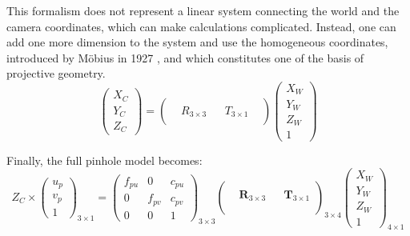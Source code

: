 This formalism does not represent a linear system connecting the world and the camera coordinates, which can make calculations complicated. Instead, one can add one more dimension to the system and use the homogeneous coordinates, introduced by Möbius in 1927 \cite{Mobius1827}, and which constitutes one of the basis of projective geometry.
\begin{equation}\label{homogeneous}
  \begin{pmatrix}X_C\\Y_C\\Z_C\end{pmatrix}
  = \begin{pmatrix} &  & & \\ & R_{3\times 3} &  & T_{3\times 1} \\ &&&&\end{pmatrix} \begin{pmatrix}X_W\\Y_W\\Z_W\\1\end{pmatrix}
\end{equation}

Finally, the full pinhole model becomes:%
\begin{equation}\label{eq:pinhole}
  \boxed{
  Z_C \times \begin{pmatrix}u_p\\v_p\\1\end{pmatrix}_{\!\!3\times 1} 
  = \begin{pmatrix}f_{pu} & 0 & c_{pu}\\ 0 & f_{pv} & c_{pv} \\ 0&0&1\end{pmatrix}_{\!\!3\times 3}
    \begin{pmatrix} \\ & \textbf{R}_{3\times 3} &  & \textbf{T}_{3\times 1} \\  \\\end{pmatrix}_{\!\!3\times 4} 
    \begin{pmatrix}X_W\\Y_W\\Z_W\\1\end{pmatrix}_{\!\!4\times1}
  }
\end{equation}

